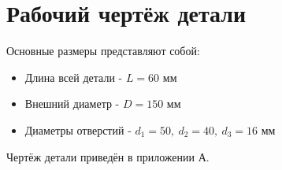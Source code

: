 \section{Рабочий чертёж детали}

Основные размеры представляют собой:
\begin{itemize}
    \item Длина всей детали - $L=60$ мм
    \item Внешний диаметр - $D=150$ мм
    \item Диаметры отверстий - $d_1=50,\ d_2=40,\ d_3=16$ мм
\end{itemize}


Чертёж детали приведён в приложении А.


